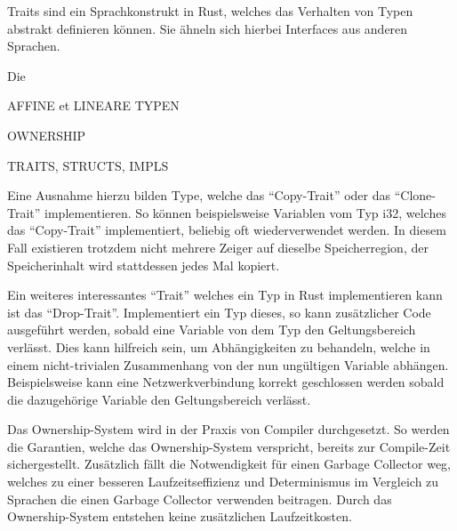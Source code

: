 Traits sind ein Sprachkonstrukt in Rust, welches das Verhalten von Typen abstrakt definieren können. Sie ähneln sich
hierbei Interfaces aus anderen Sprachen. 

Die \textit{}

AFFINE et LINEARE TYPEN

OWNERSHIP

TRAITS, STRUCTS, IMPLS


Eine Ausnahme hierzu bilden Type, welche das "`Copy-Trait"' oder das "`Clone-Trait"'
implementieren\cite{ownership}\cite{linearTypePain}.
So können beispielsweise Variablen vom Typ i32, welches
das "`Copy-Trait"' implementiert, beliebig oft wiederverwendet werden\cite{ownership}.
In diesem Fall existieren trotzdem nicht mehrere Zeiger auf dieselbe Speicherregion, der Speicherinhalt wird stattdessen jedes
Mal kopiert.

Ein weiteres interessantes "`Trait"' welches ein Typ in Rust implementieren kann ist das "`Drop-Trait"'\cite{dropTrait}.
Implementiert ein Typ dieses,
so kann zusätzlicher Code ausgeführt werden, sobald eine Variable von dem Typ den Geltungsbereich verlässt\cite{dropTrait}.
Dies kann hilfreich sein, um Abhängigkeiten zu behandeln, welche in einem nicht-trivialen Zusammenhang von der nun
ungültigen Variable abhängen.
Beispielsweise kann eine Netzwerkverbindung korrekt geschlossen werden sobald die dazugehörige Variable den
Geltungsbereich verlässt.

Das Ownership-System wird in der Praxis von Compiler durchgesetzt. So werden die Garantien, welche das Ownership-System
verspricht, bereits zur Compile-Zeit sichergestellt. Zusätzlich fällt die Notwendigkeit für einen Garbage Collector weg, welches
zu einer besseren Laufzeitseffizienz und Determinismus im Vergleich zu Sprachen die einen Garbage Collector verwenden beitragen.
Durch das Ownership-System entstehen keine zusätzlichen Laufzeitkosten\cite{whatIsOwnership}.




